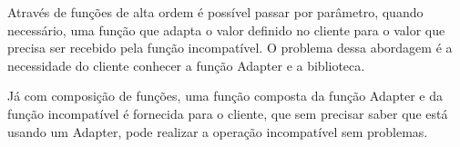 Através de funções de alta ordem é possível passar por parâmetro, 
quando necessário, uma função que adapta o valor definido no cliente 
para o valor que precisa ser recebido pela função incompatível. O 
problema dessa abordagem é a necessidade do cliente conhecer a função 
Adapter e a biblioteca.

Já com composição de funções, uma função composta da função Adapter 
e da função incompatível é fornecida para o cliente, que sem precisar 
saber que está usando um Adapter, pode realizar a operação incompatível 
sem problemas.

\begin{lstlisting}[caption={Adapter Funcional},label=fpadapter]
    

    
\end{lstlisting}
